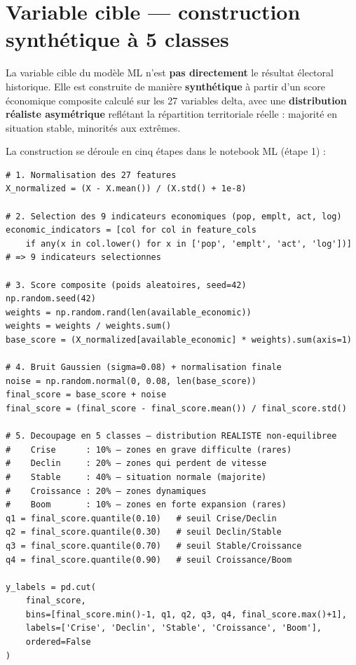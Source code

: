 \documentclass[12pt,a4paper,oneside]{report}
\begin{document}
\section{Variable cible — construction synthétique à 5 classes}

\begin{infobox}
La variable cible du modèle ML n'est \textbf{pas directement} le résultat électoral historique. Elle est construite de manière \textbf{synthétique} à partir d'un score économique composite calculé sur les 27 variables delta, avec une \textbf{distribution réaliste asymétrique} reflétant la répartition territoriale réelle : majorité en situation stable, minorités aux extrêmes.
\end{infobox}

La construction se déroule en cinq étapes dans le notebook ML (étape 1) :

\begin{lstlisting}[caption={Construction de la variable cible à 5 classes — distribution réaliste asymétrique}]
# 1. Normalisation des 27 features
X_normalized = (X - X.mean()) / (X.std() + 1e-8)

# 2. Selection des 9 indicateurs economiques (pop, emplt, act, log)
economic_indicators = [col for col in feature_cols
    if any(x in col.lower() for x in ['pop', 'emplt', 'act', 'log'])]
# => 9 indicateurs selectionnes

# 3. Score composite (poids aleatoires, seed=42)
np.random.seed(42)
weights = np.random.rand(len(available_economic))
weights = weights / weights.sum()
base_score = (X_normalized[available_economic] * weights).sum(axis=1)

# 4. Bruit Gaussien (sigma=0.08) + normalisation finale
noise = np.random.normal(0, 0.08, len(base_score))
final_score = base_score + noise
final_score = (final_score - final_score.mean()) / final_score.std()

# 5. Decoupage en 5 classes — distribution REALISTE non-equilibree
#    Crise      : 10% — zones en grave difficulte (rares)
#    Declin     : 20% — zones qui perdent de vitesse
#    Stable     : 40% — situation normale (majorite)
#    Croissance : 20% — zones dynamiques
#    Boom       : 10% — zones en forte expansion (rares)
q1 = final_score.quantile(0.10)   # seuil Crise/Declin
q2 = final_score.quantile(0.30)   # seuil Declin/Stable
q3 = final_score.quantile(0.70)   # seuil Stable/Croissance
q4 = final_score.quantile(0.90)   # seuil Croissance/Boom

y_labels = pd.cut(
    final_score,
    bins=[final_score.min()-1, q1, q2, q3, q4, final_score.max()+1],
    labels=['Crise', 'Declin', 'Stable', 'Croissance', 'Boom'],
    ordered=False
)
\end{lstlisting}
\end{document}
